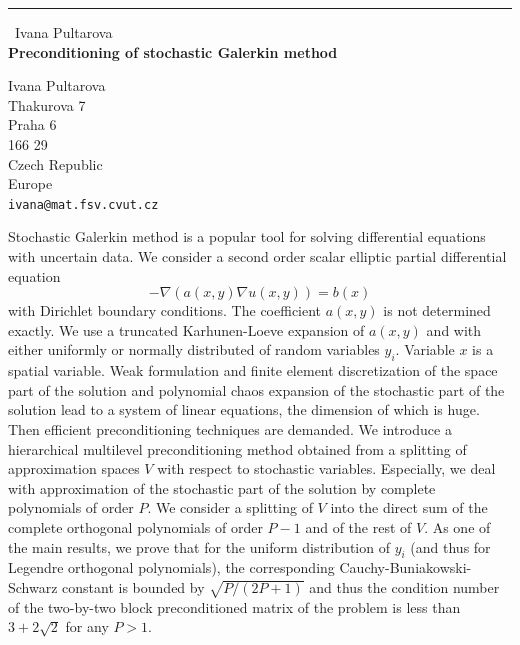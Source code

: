 \documentclass{report}
\begin{document}
\begin{center}
\rule{6in}{1pt} \
{\large Ivana Pultarova \\
{\bf Preconditioning of stochastic Galerkin method}}

Ivana Pultarova \\ Thakurova 7 \\ Praha 6 \\ 166 29 \\ Czech Republic \\ Europe
\\
{\tt ivana@mat.fsv.cvut.cz}\end{center}

Stochastic Galerkin method is a popular tool for solving differential
equations with uncertain data. We consider a second order scalar elliptic
partial differential equation
$$-\nabla\left(a(x,y)\nabla u(x,y)\right)=b(x)$$
with Dirichlet boundary conditions. The coefficient $a(x,y)$ is not
determined exactly. We use a truncated Karhunen-Loeve expansion of
$a(x,y)$ and with either uniformly or normally distributed of random
variables $y_i$. Variable $x$ is a spatial variable. Weak formulation and
finite element discretization of the space part of the solution and
polynomial chaos expansion
of the stochastic part of the solution lead to a system of linear
equations, the dimension of which is huge.
Then efficient preconditioning techniques are demanded.
We introduce a hierarchical multilevel preconditioning method obtained
from a splitting of approximation spaces $V$ with respect to stochastic
variables. Especially, we deal with approximation of the stochastic part
of the solution by complete polynomials of order $P$. We consider a
splitting of $V$ into the direct sum of the complete orthogonal
polynomials of order $P-1$ and of the rest of $V$. As one of the main
results, we prove that for the uniform distribution of $y_i$ (and thus
for Legendre orthogonal polynomials), the corresponding
Cauchy-Buniakowski-Schwarz constant is bounded by $\sqrt{P/(2P+1)}$
and thus the condition number of the two-by-two block preconditioned
matrix of the problem is less than $3+2\sqrt{2}$ for any $P>1$.
\end{document}
